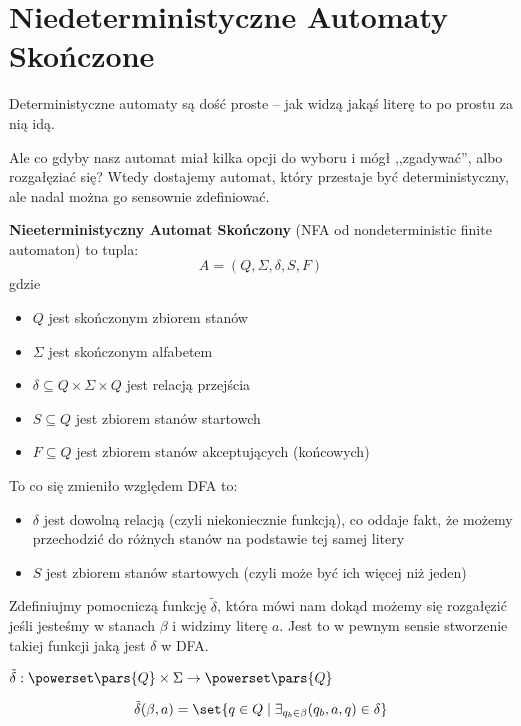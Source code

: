\section{Niedeterministyczne Automaty Skończone}
Deterministyczne automaty są dość proste -- jak widzą jakąś literę to po prostu za nią idą.

Ale co gdyby nasz automat miał kilka opcji do wyboru i mógł ,,zgadywać'', albo rozgałęziać się? Wtedy dostajemy automat, który przestaje być deterministyczny, ale nadal można go sensownie zdefiniować.

\begin{definition}
	\textbf{Nieeterministyczny Automat Skończony} (NFA od nondeterministic finite automaton) to tupla:
	\[
		A = (Q, \Sigma, \delta, S, F)
	\]
	gdzie
	\begin{itemize}
		\item \( Q \) jest skończonym zbiorem stanów
		\item \( \Sigma \) jest skończonym alfabetem
		\item \( \delta \subseteq Q \times \Sigma \times Q \) jest relacją przejścia
		\item \( S \subseteq Q \) jest zbiorem stanów startowch
		\item \( F \subseteq Q \) jest zbiorem stanów akceptujących (końcowych)
	\end{itemize}
\end{definition}

To co się zmieniło względem DFA to:
\begin{itemize}
	\item \( \delta \) jest dowolną relacją (czyli niekoniecznie funkcją), co oddaje fakt, że możemy przechodzić do różnych stanów na podstawie tej samej litery
	\item \( S \) jest zbiorem stanów startowych (czyli może być ich więcej niż jeden)
\end{itemize}

Zdefiniujmy pomocniczą funkcję \( \tilde \delta \), która mówi nam dokąd możemy się rozgałęzić jeśli jesteśmy w stanach \( \beta \) i widzimy literę \( a \). Jest to w pewnym sensie stworzenie takiej funkcji jaką jest \( \delta \) w DFA.

\begin{definition}
	\( \tilde \delta : \powerset\pars{Q} \times \Sigma \rightarrow \powerset\pars{Q} \)

	\[
		\tilde \delta(\beta, a)
		= \set{q \in Q \mid \exists_{q_b \in \beta} (q_b, a, q) \in \delta}
	\]
\end{definition}

